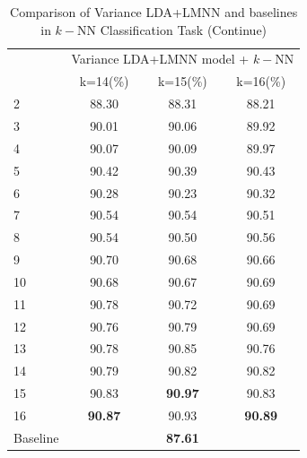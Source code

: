 \documentclass[conference]{IEEEtran}
\begin{document}
\begin{table}[htbp]
	\centering
 	\newcommand{\tabincell}[2]{\begin{tabular}{@{}#1@{}}#2\end{tabular}}
 	\renewcommand\arraystretch{1.0}
 	\caption{Comparison of Variance LDA+LMNN and baselines in $k-$NN Classification Task (Continue)}
 	\label{base9}%
 		\begin{tabular}{@{}p{1cm}<{\centering}|c|c|c}
 		\hline
 		\multirow{2}{*}{\diagbox[height=2\line,width=1.42cm,font=\tiny]{$k$}{Acc.}{$\mathit{M}$}} &
 		\multicolumn{3}{c}{Variance LDA+LMNN model + $k-$NN}\\
 		\cline{2-4}
			& {k=14(\%)} & {k=15(\%)} & {k=16(\%)}\\
 		\hline
 		2   &88.30   &88.31  &88.21 \\
 		3   &90.01   &90.06  &89.92 \\
 		4   &90.07   &90.09  &89.97 \\
 		5   &90.42   &90.39  &90.43 \\
 		6   &90.28   &90.23  &90.32 \\
 		7   &90.54   &90.54  &90.51 \\
 		8   &90.54   &90.50  &90.56 \\
 		9   &90.70   &90.68  &90.66 \\
 		10   &90.68   &90.67  &90.69 \\
 		11   &90.78   &90.72  &90.69 \\
 		12   &90.76   &90.79  &90.69 \\
 		13   &90.78   &90.85  &90.76 \\
 		14   &90.79   &90.82  &90.82 \\
 		15   &90.83   & \textbf{90.97} &90.83 \\
		16   & \textbf{90.87}  &90.93  & \textbf{90.89}\\  
		\hline
		Baseline & \multicolumn{3}{c}{\textbf{87.61}} \\
 		\hline
		\end{tabular}
\end{table}
\end{document}
